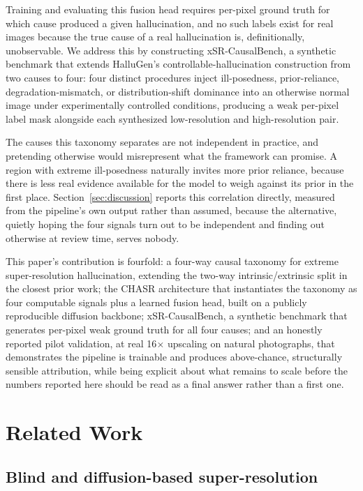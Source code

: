 \documentclass[review]{elsarticle}
\begin{document}
Training and evaluating this fusion head requires per-pixel ground truth for which cause produced a given hallucination, and no such labels exist for real images because the true cause of a real hallucination is, definitionally, unobservable. We address this by constructing xSR-CausalBench, a synthetic benchmark that extends HalluGen's controllable-hallucination construction from two causes to four: four distinct procedures inject ill-posedness, prior-reliance, degradation-mismatch, or distribution-shift dominance into an otherwise normal image under experimentally controlled conditions, producing a weak per-pixel label mask alongside each synthesized low-resolution and high-resolution pair.

The causes this taxonomy separates are not independent in practice, and pretending otherwise would misrepresent what the framework can promise. A region with extreme ill-posedness naturally invites more prior reliance, because there is less real evidence available for the model to weigh against its prior in the first place. Section~\ref{sec:discussion} reports this correlation directly, measured from the pipeline's own output rather than assumed, because the alternative, quietly hoping the four signals turn out to be independent and finding out otherwise at review time, serves nobody.

This paper's contribution is fourfold: a four-way causal taxonomy for extreme super-resolution hallucination, extending the two-way intrinsic/extrinsic split in the closest prior work; the CHASR architecture that instantiates the taxonomy as four computable signals plus a learned fusion head, built on a publicly reproducible diffusion backbone; xSR-CausalBench, a synthetic benchmark that generates per-pixel weak ground truth for all four causes; and an honestly reported pilot validation, at real 16$\times$ upscaling on natural photographs, that demonstrates the pipeline is trainable and produces above-chance, structurally sensible attribution, while being explicit about what remains to scale before the numbers reported here should be read as a final answer rather than a first one.

\section{Related Work}
\label{sec:related}

\subsection{Blind and diffusion-based super-resolution}
\end{document}
